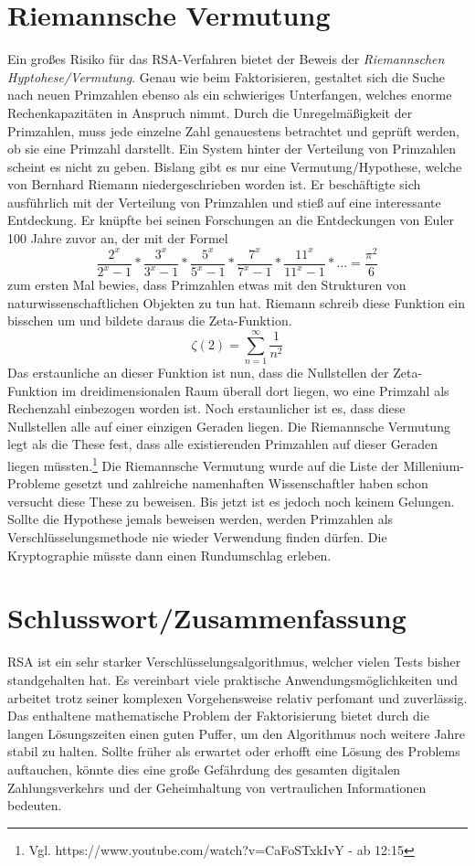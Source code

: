 \section{Riemannsche Vermutung}
Ein großes Risiko für das RSA-Verfahren bietet der Beweis der \emph{Riemannschen
Hyptohese/Vermutung}.
Genau wie beim Faktorisieren, gestaltet sich die Suche nach neuen Primzahlen ebenso als ein
schwieriges Unterfangen, welches enorme Rechenkapazitäten in Anspruch nimmt.
Durch die Unregelmäßigkeit der Primzahlen, muss jede einzelne Zahl genauestens betrachtet
und geprüft werden, ob sie eine Primzahl darstellt. Ein System hinter der
Verteilung von Primzahlen scheint es nicht zu geben. Bislang gibt es nur eine Vermutung/Hypothese, welche von Bernhard Riemann niedergeschrieben
worden ist. Er beschäftigte sich ausführlich mit der Verteilung von Primzahlen
und stieß auf eine interessante Entdeckung.
Er knüpfte bei seinen Forschungen an die Entdeckungen von Euler 100 Jahre zuvor
an, der mit der Formel
\begin{displaymath}
\frac{2^x}{2^x-1}*\frac{3^x}{3^x-1}*\frac{5^x}{5^x-1}*\frac{7^x}{7^x-1}*\frac{11^x}{11^x-1}*\ldots
=\frac{\pi^2}{6}
\end{displaymath}
zum ersten Mal bewies, dass Primzahlen etwas mit den Strukturen von
naturwissenschaftlichen Objekten zu tun hat. Riemann schreib diese Funktion ein
bisschen um und bildete daraus die Zeta-Funktion.
\begin{displaymath}
\zeta(2)=\sum_{n=1}^{\infty} \frac{1}{n^2}
\end{displaymath}
Das erstaunliche an dieser Funktion ist nun, dass die Nullstellen der
Zeta-Funktion im dreidimensionalen Raum überall dort liegen, wo eine Primzahl
als Rechenzahl einbezogen worden ist. Noch erstaunlicher ist es, dass diese Nullstellen alle auf einer
einzigen Geraden liegen. Die Riemannsche Vermutung legt als die These fest, dass
alle existierenden Primzahlen auf dieser Geraden liegen müssten.\footnote{Vgl.
  https://www.youtube.com/watch?v=CaFoSTxkIvY - ab 12:15}
\newline
Die Riemannsche Vermutung wurde auf die Liste der Millenium-Probleme gesetzt und zahlreiche
namenhaften Wissenschaftler haben schon versucht diese These zu beweisen. Bis jetzt ist es jedoch
noch keinem Gelungen. Sollte die Hypothese jemals beweisen werden, werden
Primzahlen als Verschlüsselungsmethode nie wieder Verwendung finden dürfen. Die
Kryptographie müsste dann einen Rundumschlag erleben.
\section{Schlusswort/Zusammenfassung}
RSA ist ein sehr starker Verschlüsselungsalgorithmus, welcher vielen Tests
bisher standgehalten hat. Es vereinbart viele praktische Anwendungsmöglichkeiten
und arbeitet trotz seiner komplexen Vorgehensweise relativ perfomant und
zuverlässig. Das enthaltene mathematische Problem der Faktorisierung bietet durch die langen Lösungszeiten einen guten
Puffer, um den Algorithmus noch weitere Jahre stabil zu halten. Sollte früher
als erwartet oder erhofft eine Lösung des Problems auftauchen, könnte dies eine
große Gefährdung des gesamten digitalen Zahlungsverkehrs und der Geheimhaltung
von vertraulichen Informationen bedeuten.
\newpage
